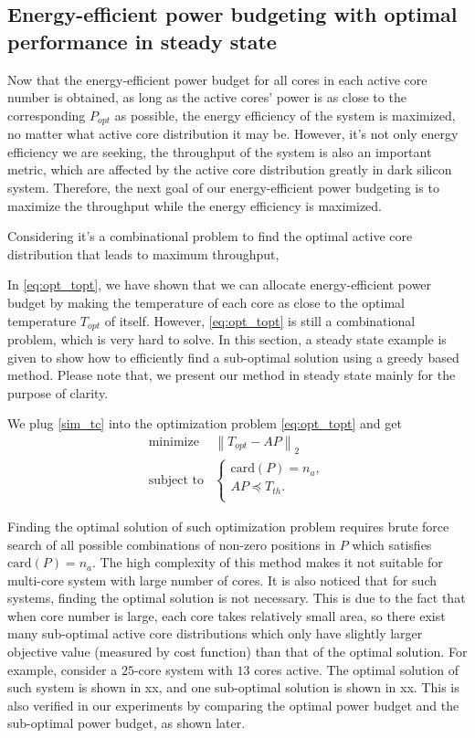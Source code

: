\subsection{Energy-efficient power budgeting with optimal performance in steady state}
Now that the energy-efficient power budget for all cores in each active core number is obtained, as long as the active cores' power is as close to the corresponding $P_{opt}$ as possible, the energy efficiency of the system is maximized, no matter what active core distribution it may be. However, it's not only energy efficiency we are seeking, the throughput of the system is also an important metric, which are affected by the active core distribution greatly in dark silicon system. Therefore, the next goal of our energy-efficient power budgeting is to maximize the throughput while the energy efficiency is maximized.

Considering it's a combinational problem to find the optimal active core distribution that leads to maximum throughput, 

In \eqref{eq:opt_topt}, we have shown that we can allocate energy-efficient power budget by making the temperature of each core as close to the optimal temperature $T_{opt}$ of itself. However, \eqref{eq:opt_topt} is still a combinational problem, which is very hard to solve. In this section, a steady state example is given to show how to efficiently find a sub-optimal solution using a greedy based method. Please note that, we present our method in steady state mainly for the purpose of clarity.

We plug \eqref{sim_tc} into the optimization problem \eqref{eq:opt_topt} and get
\begin{equation}\label{eq:sim_opt_topt}
\begin{split}
\text{minimize } &  \left \| T_{opt} - AP \right \|_{2}\\
\text{subject to} &\left\{
\begin{array}{lr}
\text{card}(P) = n_{a},\\
AP \preceq T_{th}.\\
\end{array}
\right.
\end{split}
\end{equation}

Finding the optimal solution of such optimization problem requires brute force search of all possible combinations of non-zero positions in $P$ which satisfies $\text{card}(P)=n_{a}$. The high complexity of this method makes it not suitable for multi-core system with large number of cores. It is also noticed that for such systems, finding the optimal solution is not necessary. This is due to the fact that when core number is large, each core takes relatively small area, so there exist many sub-optimal active core distributions which only have slightly larger objective value (measured by cost function) than that of the optimal solution. For example, consider a $25$-core system with $13$ cores active. The optimal solution of such system is shown in xx, and one sub-optimal solution is shown in xx. This is also verified in our experiments by comparing the optimal power budget and the sub-optimal power budget, as shown later.

